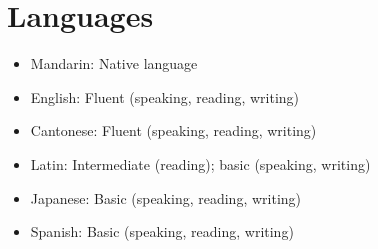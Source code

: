 
\section{\sc Languages}

\begin{itemize}
    \item Mandarin: Native language
    \item English: Fluent (speaking, reading, writing)
    \item Cantonese: Fluent (speaking, reading, writing)
    \item Latin: Intermediate (reading); basic (speaking, writing)
    \item Japanese: Basic (speaking, reading, writing)
    \item Spanish: Basic (speaking, reading, writing)
\end{itemize}
